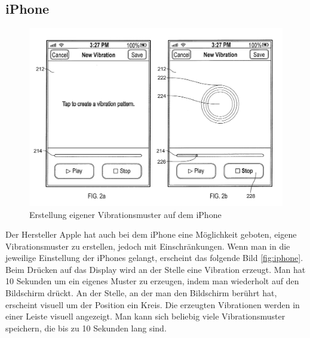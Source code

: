  
\subsection{iPhone}
\label{ch:Grundlagen:sec:RelatedWork:subsec:PersonalisierteVibration}

\begin{figure}
	\centering
    \includegraphics[width=\textwidth]{pics/iphone.png}
    \caption{Erstellung eigener Vibrationsmuster auf dem iPhone}
    \label{fig:iphone}
\end{figure}

Der Hersteller Apple hat auch bei dem iPhone eine M{\"o}glichkeit geboten, eigene Vibrationsmuster zu erstellen, jedoch mit Einschr{\"a}nkungen.
Wenn man in die jeweilige Einstellung der iPhones gelangt, erscheint das folgende Bild \autoref{fig:iphone}. 
Beim Dr{\"u}cken auf das Display wird an der Stelle eine Vibration erzeugt. 
Man hat 10 Sekunden um ein eigenes Muster zu erzeugen, indem man wiederholt auf den Bildschirm dr{\"u}ckt. 
An der Stelle, an der man den Bildschirm ber{\"u}hrt hat, erscheint visuell um der Position ein Kreis. 
Die erzeugten Vibrationen werden in einer Leiste visuell angezeigt. 
Man kann sich beliebig viele Vibrationsmuster speichern, die bis zu 10 Sekunden lang sind. \cite{fleizach2016custom}

